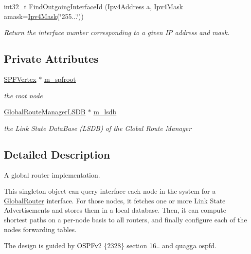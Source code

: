 \begin{DoxyCompactItemize}
int32\+\_\+t \hyperlink{classns3_1_1GlobalRouteManagerImpl_a55b3c7bf042d95de52cf56cc6699dc9a}{Find\+Outgoing\+Interface\+Id} (\hyperlink{classns3_1_1Ipv4Address}{Ipv4\+Address} a, \hyperlink{classns3_1_1Ipv4Mask}{Ipv4\+Mask} amask=\hyperlink{classns3_1_1Ipv4Mask}{Ipv4\+Mask}(\char`\"{}255...\char`\"{}))
\begin{DoxyCompactList}\small\item\em Return the interface number corresponding to a given IP address and mask. \end{DoxyCompactList}\end{DoxyCompactItemize}
\subsection*{Private Attributes}
\begin{DoxyCompactItemize}
\item 
\hyperlink{classns3_1_1SPFVertex}{S\+P\+F\+Vertex} $\ast$ \hyperlink{classns3_1_1GlobalRouteManagerImpl_a977f6b62ef1f1b58d041a2f49c093a1c}{m\+\_\+spfroot}
\begin{DoxyCompactList}\small\item\em the root node \end{DoxyCompactList}\item 
\hyperlink{classns3_1_1GlobalRouteManagerLSDB}{Global\+Route\+Manager\+L\+S\+DB} $\ast$ \hyperlink{classns3_1_1GlobalRouteManagerImpl_a7e528f818fa3e6c794b07c0b3cba5f61}{m\+\_\+lsdb}
\begin{DoxyCompactList}\small\item\em the Link State Data\+Base (L\+S\+DB) of the Global Route Manager \end{DoxyCompactList}\end{DoxyCompactItemize}


\subsection{Detailed Description}
A global router implementation. 

This singleton object can query interface each node in the system for a \hyperlink{classns3_1_1GlobalRouter}{Global\+Router} interface. For those nodes, it fetches one or more Link State Advertisements and stores them in a local database. Then, it can compute shortest paths on a per-\/node basis to all routers, and finally configure each of the node\textquotesingle{}s forwarding tables.

The design is guided by O\+S\+P\+Fv2 \{2328\} section 16.. and quagga ospfd. 

